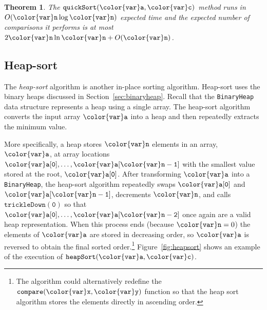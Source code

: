 \documentclass[10pt]{book}
\newcommand{\cpponly}[1]{}\newcommand{\javaonly}[1]{#1}\newcommand{\pcodeonly}[1]{}\newcommand{\notpcode}[1]{#1}\newcommand{\lang}{Java}
\newcommand{\seclabel}[1]{\label{sec:#1}}
\newcommand{\secref}[1]{Section~\ref{sec:#1}}
\newcommand{\figref}[1]{Figure~\ref{fig:#1}}
\theoremstyle{plain}
\newtheorem{thm}{Theorem}[chapter]
\newcommand{\thmlabel}[1]{\label{thm:#1}}
\theoremstyle{definition}
\begin{document}
\begin{thm}\thmlabel{quicksort}
  The \javaonly{\ensuremath{\mathtt{quickSort({\color{var}a},{\color{var}c})}}} \cpponly{\ensuremath{\mathtt{quickSort({\color{var}a})}}}
  \pcodeonly{\ensuremath{\mathtt{quickSort({\color{var}a},{\color{var}c})}}} method runs in $O(\ensuremath{\mathtt{{\color{var}n}}}\log \ensuremath{\mathtt{{\color{var}n}}})$ expected
  time and the expected number of comparisons it performs is at most
  $2\ensuremath{\mathtt{{\color{var}n}}}\ln \ensuremath{\mathtt{{\color{var}n}}} +O(\ensuremath{\mathtt{{\color{var}n}}})$.
\end{thm}

\subsection{Heap-sort}
\seclabel{heapsort}

%
The \emph{heap-sort} algorithm is another in-place sorting algorithm.
Heap-sort uses the binary heaps discussed in \secref{binaryheap}.
Recall that the \texttt{BinaryHeap} data structure represents a heap using
a single array.  The heap-sort algorithm converts the input array \ensuremath{\mathtt{{\color{var}a}}}
into a heap and then repeatedly extracts the minimum value.

More specifically, a heap stores \ensuremath{\mathtt{{\color{var}n}}} elements in an array, \ensuremath{\mathtt{{\color{var}a}}}, at array locations
$\ensuremath{\mathtt{{\color{var}a}[0]}},\ldots,\ensuremath{\mathtt{{\color{var}a}[{\color{var}n}-1]}}$ with the smallest value stored at the root,
\ensuremath{\mathtt{{\color{var}a}[0]}}.  After transforming \ensuremath{\mathtt{{\color{var}a}}} into a \texttt{BinaryHeap}, the heap-sort
algorithm repeatedly swaps \ensuremath{\mathtt{{\color{var}a}[0]}} and \ensuremath{\mathtt{{\color{var}a}[{\color{var}n}-1]}}, decrements \ensuremath{\mathtt{{\color{var}n}}}, and
calls \ensuremath{\mathtt{trickleDown(0)}} so that $\ensuremath{\mathtt{{\color{var}a}[0]}},\ldots,\ensuremath{\mathtt{{\color{var}a}[{\color{var}n}-2]}}$ once again are
a valid heap representation. When this process ends (because $\ensuremath{\mathtt{{\color{var}n}}}=0$)
the elements of \ensuremath{\mathtt{{\color{var}a}}} are stored in decreasing order, so \ensuremath{\mathtt{{\color{var}a}}} is reversed
to obtain the final sorted order.\footnote{The algorithm
could alternatively redefine the \ensuremath{\mathtt{compare({\color{var}x},{\color{var}y})}} function so that the
heap sort algorithm stores the elements directly in ascending order.}
\figref{heapsort} shows an example of the execution of \ensuremath{\mathtt{heapSort({\color{var}a},{\color{var}c})}}.
\end{document}
